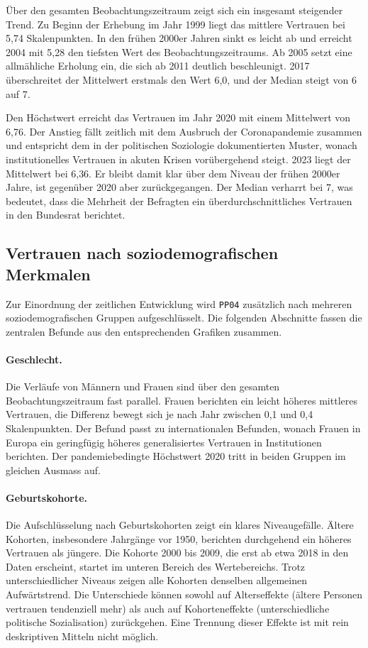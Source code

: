 Über den gesamten Beobachtungszeitraum zeigt sich ein insgesamt steigender Trend. Zu
Beginn der Erhebung im Jahr 1999 liegt das mittlere Vertrauen bei 5{,}74
Skalenpunkten. In den frühen 2000er Jahren sinkt es leicht ab und erreicht 2004 mit
5{,}28 den tiefsten Wert des Beobachtungszeitraums. Ab 2005 setzt eine allmähliche
Erholung ein, die sich ab 2011 deutlich beschleunigt. 2017 überschreitet der Mittelwert
erstmals den Wert 6{,}0, und der Median steigt von 6 auf 7.

Den Höchstwert erreicht das Vertrauen im Jahr 2020 mit einem Mittelwert von 6{,}76. Der
Anstieg fällt zeitlich mit dem Ausbruch der Coronapandemie zusammen und entspricht dem
in der politischen Soziologie dokumentierten Muster, wonach institutionelles Vertrauen
in akuten Krisen vorübergehend steigt. 2023 liegt der Mittelwert bei 6{,}36. Er bleibt
damit klar über dem Niveau der frühen 2000er Jahre, ist gegenüber 2020 aber
zurückgegangen. Der Median verharrt bei 7, was bedeutet, dass die Mehrheit der
Befragten ein überdurchschnittliches Vertrauen in den Bundesrat berichtet.



\subsection{Vertrauen nach soziodemografischen Merkmalen}
\label{subsec:soziodemografisch}

Zur Einordnung der zeitlichen Entwicklung wird \texttt{PP04} zusätzlich nach mehreren
soziodemografischen Gruppen aufgeschlüsselt. Die folgenden Abschnitte fassen die
zentralen Befunde aus den entsprechenden Grafiken zusammen.

\paragraph{Geschlecht.}
Die Verläufe von Männern und Frauen sind über den gesamten Beobachtungszeitraum fast
parallel. Frauen berichten ein leicht höheres mittleres Vertrauen, die Differenz
bewegt sich je nach Jahr zwischen 0{,}1 und 0{,}4 Skalenpunkten. Der Befund passt zu
internationalen Befunden, wonach Frauen in Europa ein geringfügig höheres
generalisiertes Vertrauen in Institutionen berichten. Der pandemiebedingte Höchstwert
2020 tritt in beiden Gruppen im gleichen Ausmass auf.

\paragraph{Geburtskohorte.}
Die Aufschlüsselung nach Geburtskohorten zeigt ein klares Niveaugefälle. Ältere
Kohorten, insbesondere Jahrgänge vor 1950, berichten durchgehend ein höheres Vertrauen
als jüngere. Die Kohorte 2000 bis 2009, die erst ab etwa 2018 in den Daten erscheint,
startet im unteren Bereich des Wertebereichs. Trotz unterschiedlicher Niveaus zeigen
alle Kohorten denselben allgemeinen Aufwärtstrend. Die Unterschiede können sowohl auf
Alterseffekte (ältere Personen vertrauen tendenziell mehr) als auch auf Kohorteneffekte
(unterschiedliche politische Sozialisation) zurückgehen. Eine Trennung dieser Effekte
ist mit rein deskriptiven Mitteln nicht möglich.

